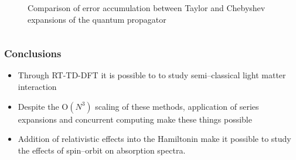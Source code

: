 \documentclass{beamer}
\begin{document}
\begin{frame}
\begin{columns}
\begin{column}{0.5\textwidth}
\begin{figure}
\caption{\footnotesize Comparison of error accumulation between Taylor and Chebyshev expansions of the quantum propagator}
\end{figure}
\end{column}
\end{columns}
\vspace{-1cm}
\end{frame}

\begin{frame}
\frametitle{Conclusions}
\begin{itemize}
\item Through RT-TD-DFT it is possible to to study semi--classical light matter interaction
\item Despite the O$(N^3)$ scaling of these methods, application of series expansions and
concurrent computing make these things possible
\item Addition of relativistic effects into the Hamiltonin make it possible to study the effects of spin--orbit
on absorption spectra.
\end{itemize}

\end{frame}
\end{document}
